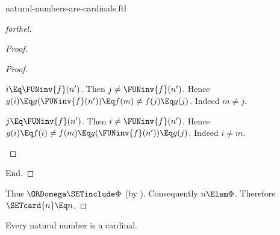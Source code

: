 \documentclass{stex}
\begin{document}
\begin{smodule}{natural-numbers-are-cardinals.ftl}
\begin{proof}[forthel]
\begin{proof}
\begin{proof}
        \begin{case}{$i \Eq \FUNinv{f}(n')$.}
          Then $j \neq \FUNinv{f}(n')$.
          Hence $g(i)
            \Eq g(\FUNinv{f}(n'))
            \Eq f(m)
            \neq f(j)
            \Eq g(j)$.
          Indeed $m \neq j$.
        \end{case}

        \begin{case}{$j \Eq \FUNinv{f}(n')$.}
          Then $i \neq \FUNinv{f}(n')$.
          Hence $g(i)
            \Eq f(i)
            \neq f(m)
            \Eq g(\FUNinv{f}(n'))
            \Eq g(j)$.
          Indeed $i \neq m$.
        \end{case}
      \end{proof}
    End.
  \end{proof}

  Thus $\ORDomega \SETinclude \Phi$ (by ).
  Consequently $n \Elem \Phi$.
  Therefore $\SETcard{n} \Eq n$.
\end{proof}

\begin{corollary}[forthel]
  Every natural number is a cardinal.
\end{corollary}
\end{smodule}
\end{document}
